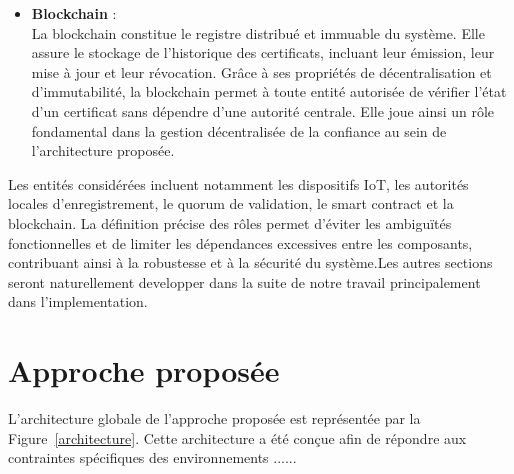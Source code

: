 \documentclass[12pt]{report}
\begin{document}
\begin{itemize}
\begin{itemize}
\begin{itemize}
    \item \textbf{Blockchain} : \\
    La blockchain constitue le registre distribué et immuable du système. Elle assure le stockage de l’historique des certificats, incluant leur émission, leur mise à jour et leur révocation. Grâce à ses propriétés de décentralisation et d’immutabilité, la blockchain permet à toute entité autorisée de vérifier l’état d’un certificat sans dépendre d’une autorité centrale. Elle joue ainsi un rôle fondamental dans la gestion décentralisée de la confiance au sein de l’architecture proposée.
\end{itemize}


Les entités considérées incluent notamment les dispositifs IoT, les autorités locales d’enregistrement, le quorum de validation, le smart contract et la blockchain. La définition précise des rôles permet d’éviter les ambiguïtés fonctionnelles et de limiter les dépendances excessives entre les composants, contribuant ainsi à la robustesse et à la sécurité du système.Les autres  sections seront naturellement developper dans la suite de notre travail principalement dans l'implementation.



\section{Approche proposée}

L’architecture globale de l’approche proposée est représentée par la Figure~\ref{architecture}. Cette architecture a été conçue afin de répondre aux contraintes spécifiques des environnements ......



\end{itemize}
\end{itemize}
\end{document}

